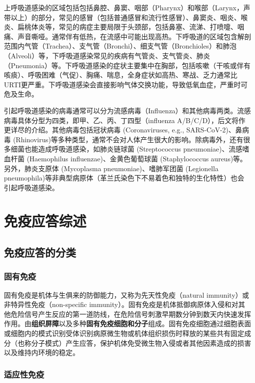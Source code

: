 \documentclass[9pt,a4paper,twoside]{rho-class/rho}
\begin{document}
    上呼吸道感染的区域包括包括鼻腔、鼻窦、咽部（Pharynx）和喉部（Larynx，声带以上）的部分，常见的感冒（包括普通感冒和流行性感冒）、鼻窦炎、咽炎、喉炎、扁桃体炎等，常见的病症主要局限于头颈部，包括鼻塞、流涕、打喷嚏、咽痛、声音嘶哑。通常伴有低热，在流感中可能出现高热。下呼吸道的区域包含解剖范围内气管（Trachea）、支气管（Bronchi）、细支气管（Bronchioles）和肺泡（Alveoli）等，下呼吸道感染常见的疾病有气管炎、支气管炎、肺炎（Pneumonia）等。下呼吸道感染的症状主要集中在胸部，包括咳嗽（干咳或伴有咳痰）、呼吸困难（气促）、胸痛、喘息，全身症状如高热、寒战、乏力通常比URTI更严重。下呼吸道感染会直接影响气体交换功能，导致低氧血症，严重时可危及生命。
    
    引起呼吸道感染的病毒通常可以分为流感病毒（Influenza）和其他病毒两类。流感病毒具体分型为四类，即甲、乙、丙、丁四型（influenza A/B/C/D），后文将作更详尽的介绍。其他病毒包括冠状病毒 (Coronaviruses, e.g., SARS-CoV-2)、鼻病毒 (Rhinovirus)等多种类型，通常不会对人体产生很大的影响。除病毒外，还有很多细菌也能造成呼吸道感染，如肺炎链球菌 (Streptococcus pneumoniae)、流感嗜血杆菌 (Haemophilus influenzae)、金黄色葡萄球菌 (Staphylococcus aureus)等。另外，肺炎支原体 (Mycoplasma pneumoniae)、嗜肺军团菌 (Legionella pneumophila)等非典型病原体（革兰氏染色下不易着色和独特的生化特性）也会引起呼吸道感染。

\section{免疫应答综述}

\subsection{免疫应答的分类}

\subsubsection{固有免疫}

        固有免疫是机体与生俱来的防御能力，又称为先天性免疫（natural immunity）或非特异性免疫（non-specific immunity）。固有免疫是机体抵御病原体入侵和对其他危险信号产生反应的第一道防线，在危险信号刺激早期数分钟到数天内快速发挥作用。由\textbf{组织屏障}以及多种\textbf{固有免疫细胞和分子}组成。固有免疫细胞通过细胞表面或细胞内的模式识别受体识别病原微生物或机体组织损伤时释放的某些共有固定成分（也称分子模式）产生应答，保护机体免受微生物入侵或者其他因素造成的损害以及维持内环境的稳定。

        \subsubsection{适应性免疫}
\end{document}
